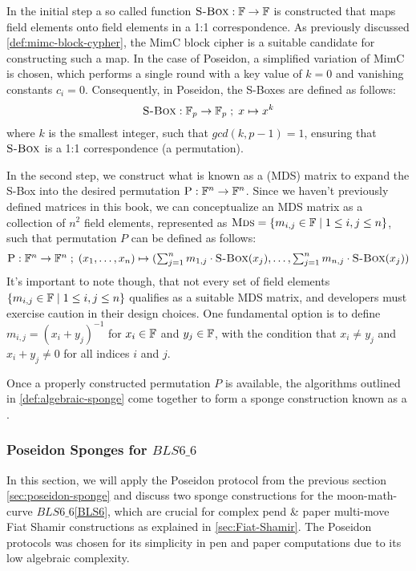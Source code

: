 In the initial step a so called  function $\textsc{S-Box}:\mathbb{F} \to \mathbb{F}$ is constructed that maps field elements onto field elements in a 1:1 correspondence. As previously discussed \ref{def:mimc-block-cypher}, the MimC block cipher is a suitable candidate for constructing such a map. In the case of Poseidon, a simplified variation of MimC is chosen, which performs a single round with a key value of $k=0$ and vanishing constants $c_i=0$. Consequently, in Poseidon, the S-Boxes are defined as follows:
\begin{equation}
\textsc{S-Box}: \mathbb{F}_p \to \mathbb{F}_p\;;\; x \mapsto x^k
\end{equation}
where $k$ is the smallest integer, such that $gcd(k,p-1)=1$, ensuring that $\textsc{S-Box}$ is a 1:1 correspondence (a permutation). 

In the second step, we construct what is known as a  (MDS) matrix to expand the S-Box into the desired permutation $\textsc{P}:\mathbb{F}^n \to \mathbb{F}^n$. Since we haven't previously defined matrices in this book, we can conceptualize an MDS matrix as a collection of $n^2$ field elements, represented as $\textsc{Mds} = \{m_{i,j}\in \mathbb{F} \; | \; 1 \leq i, j \leq n\}$, such that permutation $P$ can be defined as follows:
\begin{equation}
\textstyle\textsc{P}:\mathbb{F}^n \to \mathbb{F}^n\;;\; (x_1,\ldots,x_n) \mapsto
(\sum_{j=1}^n m_{1,j}\cdot\textsc{S-Box}(x_j),\ldots, \sum_{j=1}^n m_{n,j}\cdot\textsc{S-Box}(x_j))
\end{equation}
It's important to note though, that not every set of field elements $\{m_{i,j}\in \mathbb{F} \; | \; 1 \leq i, j \leq n\}$ qualifies as a suitable MDS matrix, and developers must exercise caution in their design choices. One fundamental option is to define $m_{i,j}=(x_i+y_j)^{-1}$ for $x_i\in \mathbb{F}$ and $y_j\in \mathbb{F}$, with the condition that $x_i \neq y_j$ and $x_i + y_j \neq 0$ for all indices $i$ and $j$.

Once a properly constructed permutation $P$ is available, the algorithms outlined in \ref{def:algebraic-sponge} come together to form a sponge construction known as a .
\subsubsection{Poseidon Sponges for $BLS6\_6$}\label{sec:bls-scalar-sponge}
In this section, we will apply the Poseidon protocol from the previous section \ref{sec:poseidon-sponge} and discuss two sponge constructions for the moon-math-curve $BLS6\_6$\ref{BLS6}, which are crucial for complex pend \& paper multi-move Fiat Shamir constructions as explained in \ref{sec:Fiat-Shamir}. The Poseidon protocols was  chosen for its simplicity in pen and paper computations due to its low algebraic complexity.

